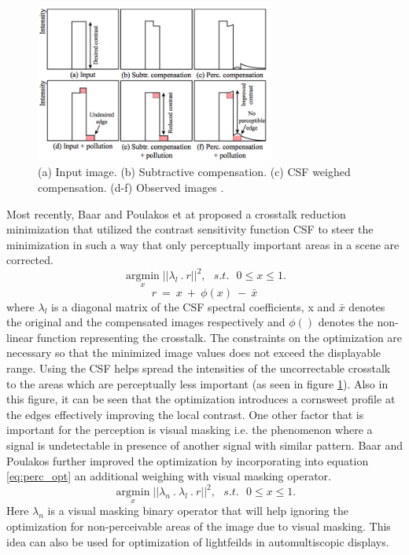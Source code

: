 \begin{figure}
\centering
    \includegraphics[width=0.7\textwidth]{./Template_Figures/perceptual_ct}
    \caption{(a) Input image. (b) Subtractive compensation. (c) CSF weighed compensation. (d-f) Observed images \cite{van2011perceptually}.\label{fig:perc_opt}}
\end{figure}
 Most recently, Baar and Poulakos et at \cite{van2011perceptually} proposed a crosstalk reduction minimization that utilized the contrast sensitivity function CSF to steer the minimization in such a way that only perceptually important areas in a scene are corrected.
 \begin{equation}
\underset{x}{\operatorname{argmin}}||\lambda_l \: . \: r||^2, \:\:\: s.t. \:\:\: 0 \leq x \leq 1.
\label{eq:perc_opt}
\end{equation}
\begin{equation}
r\: = \: x\: + \: \phi(x)\: - \: \bar{x}
\label{eq:residual_eq}
\end{equation}
where $\lambda_l$ is a diagonal matrix of the CSF spectral coefficients, x and $\bar{x}$ denotes the original and the compensated images respectively and $\phi()$ denotes the non-linear function representing the crosstalk. The constraints on the optimization are necessary so that the minimized image values does not exceed the displayable range. Using the CSF helps spread the intensities of the uncorrectable crosstalk to the areas which are perceptually less important (as seen in figure \ref{fig:perc_opt}). Also in this figure, it can be seen that the optimization introduces a cornsweet profile at the edges effectively improving the local contrast. One other factor that is important for the perception is visual masking i.e. the phenomenon where a signal is undetectable in presence of another signal with similar pattern. Baar and Poulakos further improved the optimization by incorporating into equation \ref{eq:perc_opt} an additional weighing with visual masking operator.
\begin{equation}
\underset{x}{\operatorname{argmin}}||\lambda_n\:.\:\lambda_l \: . \: r||^2, \:\:\: s.t. \:\:\: 0 \leq x \leq 1.
\label{eq:perc_opt_vm}
\end{equation}
Here $\lambda_n$ is a visual masking binary operator that will help ignoring the optimization for non-perceivable areas of the image due to visual masking. This idea can also be used for optimization of lightfeilds in automultiscopic displays.

